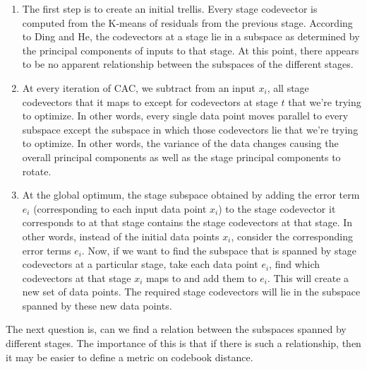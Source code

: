 \documentclass[12pt,letterpaper,doublespaced,ETD]{gt-ece-thesis}
\begin{document}
\begin{enumerate}
\item The first step is to create an initial trellis.  Every stage codevector is computed from the K-means of residuals from the previous stage.  According to Ding and He, the codevectors at a stage lie in a subspace as determined by the principal components of inputs to that stage.  At this point, there appears to be no apparent relationship between the subspaces of the different stages.
\item At every iteration of CAC, we subtract from an input $x_i$, all stage codevectors that it maps to except for codevectors at stage $t$ that we're trying to optimize.  In other words, every single data point moves parallel to every subspace except the subspace in which those codevectors lie that we're trying to optimize.  In other words, the variance of the data changes causing the overall principal components as well as the stage principal components to rotate.
\item At the global optimum, the stage subspace obtained by adding the error term $e_i$ (corresponding to each input data point $x_i$) to the stage codevector it corresponds to at that stage contains the stage codevectors at that stage.  In other words, instead of the initial data points $x_i$, consider the corresponding error terms $e_i$.  Now, if we want to find the subspace that is spanned by stage codevectors at a particular stage, take each data point $e_i$, find which codevectors at that stage $x_i$ maps to and add them to $e_i$.  This will create a new set of data points.  The required stage codevectors will lie in the subspace spanned by these new data points.
\end{enumerate}

The next question is, can we find a relation between the subspaces spanned by different stages.  The importance of this is that if there is such a relationship, then it may be easier to define a metric on codebook distance.
\end{document}
